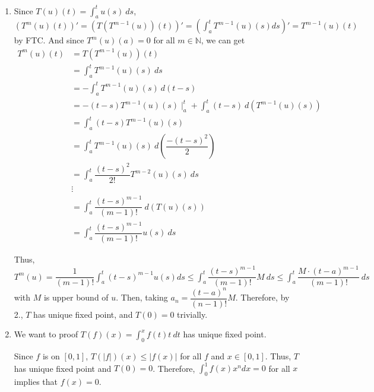 \documentclass[12pt]{article}
\begin{document}
\begin{enumerate}
    \item Since $T(u)(t) = \displaystyle\int_a^t u(s)\ ds$, 
    $\left( T^m(u)(t)\right)' = \left( T(T^{m-1}(u))(t)\right)' = \left( \displaystyle\int_{a}^{t} T^{m-1}(u)(s) ds\right)' = T^{m-1}(u)(t)$ by FTC.
    And since $T^m(u)(a) = 0$ for all $m\in \mathbb{N}$,
    we can get \begin{align*}
        T^{m}(u)(t) &= T(T^{m-1}(u))(t)\\
        &= \int_{a}^{t} T^{m-1}(u)(s)\ ds\\
        &= -\int_{a}^{t} T^{m-1}(u)(s)\ d(t-s)\\
        &= - (t-s) T^{m-1}(u)(s)\mid_a^t + \int_{a}^{t} (t-s)\ d(T^{m-1}(u)(s))\\
        &= \int_{a}^{t} (t-s)T^{m-1}(u)(s)\\
        &= \int_{a}^{t} T^{m-1}(u)(s)\ d(\dfrac{-(t-s)^2}{2})\\
        &= \int_{a}^{t} \dfrac{(t-s)^2}{2!} T^{m-2}(u)(s)\ ds\\
        &\vdots\\
        &= \int_{a}^{t} \dfrac{(t-s)^{m-1}}{(m-1)!} \ d(T(u)(s))\\
        &= \int_{a}^{t} \dfrac{(t-s)^{m-1}}{(m-1)!} u(s)\ ds
    \end{align*}

    Thus, $T^m(u) = \dfrac{1}{(m-1)!}\displaystyle\int_{a}^{t} (t-s)^{m-1} u(s) ds \leq \displaystyle\int_{a}^{t} \dfrac{(t-s)^{m-1}}{(m-1)!} M\ ds \leq \displaystyle\int_{a}^{t} \dfrac{M\cdot (t-a)^{m-1}}{(m-1)!}\ ds$
    with $M$ is upper bound of $u$. Then, taking $a_n = \dfrac{(t-a)^n}{(n-1)!}M$.
    Therefore, by 2., $T$ has unique fixed point, and $T(0) = 0$ trivially.

    \item We want to proof $T(f)(x) = \displaystyle\int_0^x f(t)t\ dt$ has unique fixed point.
    
    Since $f$ is on $[0, 1]$, $T(|f|)(x) \leq |f(x)|$ for all $f$ and $x\in [0, 1]$.
    Thus, $T$ has unique fixed point and $T(0) = 0$. 
    Therefore, $\int_{0}^{1} f(x) x^n dx = 0$ for all $x$ implies that $f(x) = 0$.
\end{enumerate}
\end{document}
